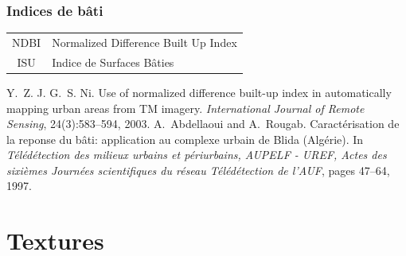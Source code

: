 \documentclass[compress]{beamer}
\begin{document}
\begin{frame}
\frametitle{Indices de bâti}
\footnotesize \centering
\begin{tabular}{|c|l|}
\hline
NDBI &  Normalized Difference Built Up Index \cite{Zha2003-NDBI} \\
ISU &  Indice de Surfaces Bâties \cite{Abdellaoui1997-ISU} \\
\hline
\end{tabular}
\begin{thebibliography}{noidea}
\tiny
{}
Y.~Z. J. G.~S. Ni.
 Use of normalized difference built-up index in automatically mapping
  urban areas from {TM} imagery.
 {\em International Journal of Remote Sensing}, 24(3):583--594,
        2003.
A.~Abdellaoui and A.~Rougab.
 Caract\'erisation de la reponse du b\^ati: application au complexe
  urbain de {B}lida ({A}lg\'erie).
 In {\em T\'el\'ed\'etection des milieux urbains et p\'eriurbains,
  AUPELF - UREF, Actes des sixi\`emes Journ\'ees scientifiques du r\'eseau
  T\'el\'ed\'etection de l'AUF}, pages 47--64, 1997.
\end{thebibliography}
\end{frame}


\section{Textures}
\end{document}
